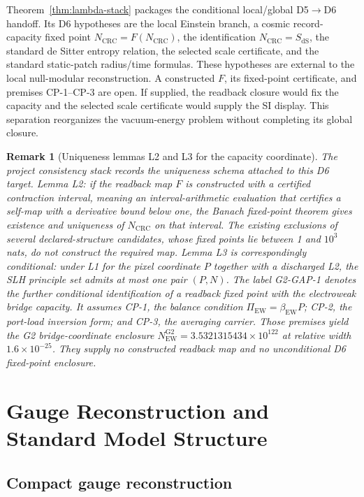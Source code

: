 \documentclass[11pt]{article}
\newtheorem{remark}[theorem]{Remark}
\begin{document}
Theorem~\ref{thm:lambda-stack} packages the conditional local/global D5\(\to\)D6 handoff. Its D6
hypotheses are the local Einstein branch, a cosmic record-capacity fixed point
\(N_{\mathrm{CRC}}=F(N_{\mathrm{CRC}})\), the identification
\(N_{\mathrm{CRC}}=S_{\mathrm{dS}}\), the standard de Sitter entropy relation, the selected scale
certificate, and the standard static-patch radius/time formulas. These hypotheses are external to
the local null-modular reconstruction. A constructed \(F\), its fixed-point certificate, and
premises CP-1--CP-3 are open. If supplied, the readback closure would fix the capacity and the
selected scale certificate would supply the SI display. This separation reorganizes the
vacuum-energy problem without completing its global closure.

\begin{remark}[Uniqueness lemmas L2 and L3 for the capacity coordinate]\label{rem:l2-l3-capacity}
The project consistency stack records the uniqueness schema attached to this D6 target. Lemma L2:
if the readback map \(F\) is constructed with a certified contraction interval, meaning an
interval-arithmetic evaluation that certifies a self-map with a derivative bound below one, the
Banach fixed-point theorem gives existence and uniqueness of \(N_{\mathrm{CRC}}\) on that interval.
The existing exclusions of several declared-structure candidates, whose fixed points lie between
1 and \(10^{3}\) nats, do not construct the required map. Lemma L3 is correspondingly conditional:
under L1 for the pixel coordinate \(P\) together with a discharged L2, the SLH principle set admits
at most one pair \((P,N)\). The label G2-GAP-1 denotes the further conditional identification of a
readback fixed point with the electroweak bridge capacity. It assumes CP-1, the balance condition
\(\Pi_{\mathrm{EW}}=\beta_{\mathrm{EW}}P\); CP-2, the port-load inversion form; and CP-3, the
averaging carrier. Those premises yield the G2 bridge-coordinate enclosure
\(N_{\mathrm{EW}}^{\mathrm{G2}}=3.5321315434\times10^{122}\) at relative width
\(1.6\times10^{-25}\). They supply no constructed readback map and no unconditional D6 fixed-point
enclosure.
\end{remark}

\section{Gauge Reconstruction and Standard Model Structure}

\subsection{Compact gauge reconstruction}
\end{document}
